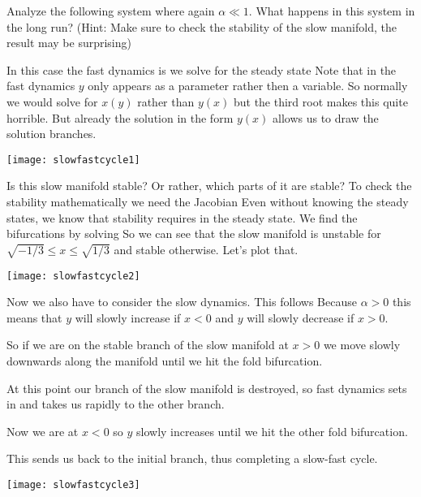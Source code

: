 Analyze the following system 
where again $\alpha\ll 1$. What happens in this system in the long run? (Hint: Make sure to check the stability of the slow manifold, the result may be surprising)

\solution
In this case the fast dynamics is 
we solve for the steady state
Note that in the fast dynamics $y$ only appears as a parameter 
rather then a variable. So normally we would solve for $x(y)$ rather than $y(x)$ but the third root makes this quite horrible. But already the solution in the form $y(x)$ allows us to draw the solution branches.

\texttt{[image: slowfastcycle1]}

Is this slow manifold stable? Or rather, which parts of it are stable? 
To check the stability mathematically we need the Jacobian
Even without knowing the steady states, we know that stability requires
in the steady state. We find the bifurcations by solving 
So we can see that the slow manifold is unstable for $\sqrt{-1/3}\leq x \leq \sqrt{1/3}$ and stable otherwise. Let's plot that.

\texttt{[image: slowfastcycle2]}

Now we also have to consider the slow dynamics. This follows
Because $\alpha>0$ this means that $y$ will slowly increase if $x<0$ and $y$ will slowly decrease if $x>0$.\nl

So if we are on the stable branch of the slow manifold at $x>0$ we move slowly downwards along the manifold until we hit the fold bifurcation. \nl

At this point our branch of the slow manifold is destroyed, so fast dynamics sets in and takes us rapidly to the other branch. \nl

Now we are at $x<0$ so $y$ slowly increases until we hit the other fold bifurcation. \nl

This sends us back to the initial branch, thus completing a slow-fast cycle. 

\texttt{[image: slowfastcycle3]}


